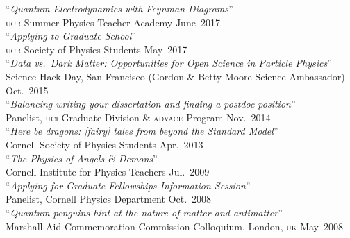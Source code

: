 \documentclass[margin,line]{resume}
\newcommand{\mytalksep}{-.1mm}
\newcommand{\mytalkskip}{2mm}
\newcommand{\scap}[1]{\textsc{\MakeLowercase{#1}}}
\begin{document}
\begin{resume}
``\emph{Quantum Electrodynamics with Feynman Diagrams}''\vspace{\mytalksep}\\ 
\scap{UCR} Summer Physics Teacher Academy \hfill June~{2017}\vspace{\mytalkskip}\\ 
%
``\emph{Applying to Graduate School}''\vspace{\mytalksep}\\ 
\scap{UCR} Society of Physics Students \hfill May~{2017}\vspace{\mytalkskip}\\ 
%
``\emph{Data vs.\ Dark Matter: Opportunities for Open Science in Particle Physics}''\vspace{\mytalksep}\\ 
Science Hack Day, San Francisco (Gordon \& Betty Moore Science Ambassador) \hfill Oct.~{2015}\vspace{\mytalkskip}\\ 
%
``\emph{Balancing writing your dissertation and finding a postdoc position}''\vspace{\mytalksep}\\ 
Panelist, \scap{UCI} Graduate Division \& \textsc{advace} Program \hfill Nov.~{2014}\vspace{\mytalkskip}\\ 
%
``\emph{Here be dragons: [fairy] tales from beyond the Standard Model}''\vspace{\mytalksep}\\ 
Cornell Society of Physics Students \hfill Apr.~{2013}\vspace{\mytalkskip}\\ 
%
``\emph{The Physics of \emph{Angels \& Demons}}''\vspace{\mytalksep}\\ 
Cornell Institute for Physics Teachers \hfill Jul.~{2009}\vspace{\mytalkskip}\\ 
%
``\emph{Applying for Graduate Fellowships Information Session}''\vspace{\mytalksep}\\ 
Panelist, Cornell Physics Department \hfill Oct.~{2008}\vspace{\mytalkskip}\\ 
%
``\emph{Quantum penguins hint at the nature of matter and antimatter}'' \vspace{\mytalksep}\\ 
Marshall Aid Commemoration Commission Colloquium, London, \scap{UK}
\hfill %
May~2008%

\end{resume}
\end{document}
